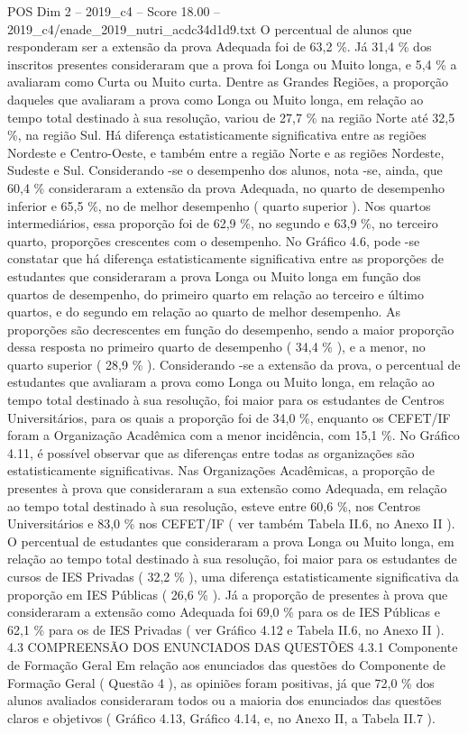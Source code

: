 \begin{textsample}{POS Dim 2 – 2019\_c4 – Score 18.00 – 2019\_c4/enade\_2019\_nutri\_acdc34d1d9.txt}
O percentual de alunos que responderam ser a extensão da prova Adequada foi de 63,2 \%.
Já 31,4 \% dos inscritos presentes consideraram que a prova foi Longa ou Muito longa, e 5,4 \% a avaliaram como Curta ou Muito curta.
Dentre as Grandes Regiões, a proporção daqueles que avaliaram a prova como Longa ou Muito longa, em relação ao tempo total destinado à sua resolução, variou de 27,7 \% na região Norte até 32,5 \%, na região Sul.
Há diferença estatisticamente significativa entre as regiões Nordeste e Centro-Oeste, e também entre a região Norte e as regiões Nordeste, Sudeste e Sul.
Considerando -se o desempenho dos alunos, nota -se, ainda, que 60,4 \% consideraram a extensão da prova Adequada, no quarto de desempenho inferior e 65,5 \%, no de melhor desempenho ( quarto superior ).
Nos quartos intermediários, essa proporção foi de 62,9 \%, no segundo e 63,9 \%, no terceiro quarto, proporções crescentes com o desempenho.
No Gráfico 4.6, pode -se constatar que há diferença estatisticamente significativa entre as proporções de estudantes que consideraram a prova Longa ou Muito longa em função dos quartos de desempenho, do primeiro quarto em relação ao terceiro e último quartos, e do segundo em relação ao quarto de melhor desempenho.
As proporções são decrescentes em função do desempenho, sendo a maior proporção dessa resposta no primeiro quarto de desempenho ( 34,4 \% ), e a menor, no quarto superior ( 28,9 \% ).
Considerando -se a extensão da prova, o percentual de estudantes que avaliaram a prova como Longa ou Muito longa, em relação ao tempo total destinado à sua resolução, foi maior para os estudantes de Centros Universitários, para os quais a proporção foi de 34,0 \%, enquanto os CEFET/IF foram a Organização Acadêmica com a menor incidência, com 15,1 \%.
No Gráfico 4.11, é possível observar que as diferenças entre todas as organizações são estatisticamente significativas.
Nas Organizações Acadêmicas, a proporção de presentes à prova que consideraram a sua extensão como Adequada, em relação ao tempo total destinado à sua resolução, esteve entre 60,6 \%, nos Centros Universitários e 83,0 \% nos CEFET/IF ( ver também Tabela II.6, no Anexo II ).
O percentual de estudantes que consideraram a prova Longa ou Muito longa, em relação ao tempo total destinado à sua resolução, foi maior para os estudantes de cursos de IES Privadas ( 32,2 \% ), uma diferença estatisticamente significativa da proporção em IES Públicas ( 26,6 \% ).
Já a proporção de presentes à prova que consideraram a extensão como Adequada foi 69,0 \% para os de IES Públicas e 62,1 \% para os de IES Privadas ( ver Gráfico 4.12 e Tabela II.6, no Anexo II ). 4.3 COMPREENSÃO DOS ENUNCIADOS DAS QUESTÕES 4.3.1 Componente de Formação Geral Em relação aos enunciados das questões do Componente de Formação Geral ( Questão 4 ), as opiniões foram positivas, já que 72,0 \% dos alunos avaliados consideraram todos ou a maioria dos enunciados das questões claros e objetivos ( Gráfico 4.13, Gráfico 4.14, e, no Anexo II, a Tabela II.7 ).

\end{textsample}

